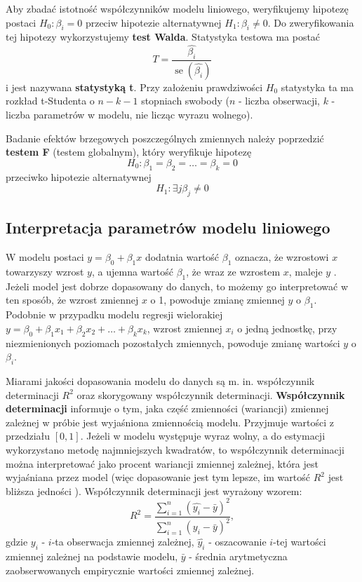 \documentclass[12pt]{mwbk}
\theoremstyle{plain}
\theoremstyle{definition}
\theoremstyle{definition}
\begin{document}
Aby zbadać istotność współczynników modelu liniowego, weryfikujemy hipotezę postaci $H_0: \beta_i = 0$ przeciw hipotezie alternatywnej $H_1: \beta_i \neq 0.																																																																																																																																																																																																																																																																																																																																																																																																																																																																																																																													$ Do zweryfikowania tej hipotezy wykorzystujemy \textbf{test Walda}. Statystyka testowa ma postać $$T=\frac{\hat{\beta_i}}{\operatorname{se}(\hat{\beta_i})}$$ i jest nazywana \textbf{statystyką t}. Przy założeniu prawdziwości $H_0$ statystyka ta ma rozkład t-Studenta o $n-k-1$ stopniach swobody ($n$ - liczba obserwacji, $k$ - liczba parametrów w modelu, nie licząc wyrazu wolnego).

Badanie efektów brzegowych poszczególnych zmiennych należy poprzedzić \textbf{testem F} (testem globalnym), który weryfikuje hipotezę $$H_0: \beta_1=\beta_2=\ldots=\beta_k=0$$
 przeciwko hipotezie alternatywnej $$H_1: \exists{j} \beta_j \neq 0 $$

\subsection{Interpretacja parametrów modelu liniowego}

W modelu postaci $y=\beta_0 +\beta_1 x$ dodatnia wartość $\beta_1$ oznacza, że wzrostowi $x$ towarzyszy wzrost $y$, a ujemna wartość $\beta_1$, że wraz ze wzrostem $x$, maleje $y$ \cite{rozrzut}. Jeżeli model jest dobrze dopasowany do danych, to możemy go interpretować w ten sposób, że wzrost zmiennej $x$ o 1, powoduje zmianę zmiennej $y$ o $\beta_1$. Podobnie w przypadku modelu regresji wielorakiej
$y=\beta_0+\beta_1 x_1+\beta_2 x_2 + \ldots + \beta_k x_k$,
wzrost zmiennej $x_i$ o jedną jednostkę, przy niezmienionych poziomach pozostałych zmiennych, powoduje zmianę wartości $y$ o $\beta_i$.

Miarami jakości dopasowania modelu do danych są m. in. współczynnik determinacji $R^2$ oraz skorygowany współczynnik determinacji. \textbf{Współczynnik determinacji} informuje o tym, jaka część zmienności (wariancji) zmiennej zależnej w próbie jest wyjaśniona zmiennością modelu. Przyjmuje wartości z przedziału $[0,1]$. Jeżeli w modelu występuje wyraz wolny, a do estymacji wykorzystano metodę najmniejszych kwadratów, to współczynnik determinacji można interpretować jako procent wariancji zmiennej zależnej, która jest wyjaśniana przez model (więc dopasowanie jest tym lepsze, im wartość $R^2$ jest bliższa jedności \cite{r2}). Współczynnik determinacji jest wyrażony wzorem:
$$R^2=\frac{\sum\limits_{i=1}^{n}(\hat{y_i}-\bar{y})^2}{\sum\limits_{i=1}^{n}(y_i-\bar{y})^2},$$ gdzie $y_i$ - $i$-ta obserwacja zmiennej zależnej, $\hat{y_i}$ - oszacowanie $i$-tej wartości zmiennej zależnej na podstawie modelu, $\bar{y}$ - średnia arytmetyczna zaobserwowanych empirycznie wartości zmiennej zależnej.
\end{document}
